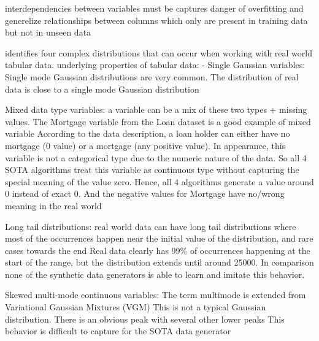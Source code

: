         interdependencies between variables must be captures \cite{lederrey2022DATGANIntegratingExperta}
        danger of overfitting and generelize relationships between columns which only are present in training data but not in unseen data \cite{lederrey2022DATGANIntegratingExperta}




        \cite{zhao2022CTABGANEnhancingTabular} identifies four complex distributions that can occur when working with real world tabular data.
        underlying properties of tabular data: \cite{zhao2022CTABGANEnhancingTabular}
        - Single Gaussian variables:
            Single mode Gaussian distributions are very common.
            The distribution of real data is close to a single mode Gaussian distribution
        
        Mixed data type variables:\cite{zhao2022CTABGANEnhancingTabular}
            a variable can be a mix of these two types + missing values. The Mortgage variable from the Loan dataset is a good example of mixed variable
            According to the data description, a loan holder can either have no mortgage (0 value) or a mortgage (any positive value). 
            In appearance, this variable is not a categorical type due to the numeric nature of the data. 
            So all 4 SOTA algorithms treat this variable as continuous type without capturing the special meaning of the value zero. 
            Hence, all 4 algorithms generate a value around 0 instead of exact 0. And the negative values for Mortgage have no/wrong meaning in the real world
        
        Long tail distributions:\cite{zhao2022CTABGANEnhancingTabular}
            real world data can have long tail distributions where most of the occurrences happen near the initial value of the distribution, and rare cases towards the end
            Real data clearly has 99\% of occurrences happening at the start of the range, 
            but the distribution extends until around 25000. 
            In comparison none of the synthetic data generators is able to learn and imitate this behavior.
        
        Skewed multi-mode continuous variables:\cite{zhao2022CTABGANEnhancingTabular}
            The term multimode is extended from Variational Gaussian Mixtures (VGM)
            This is not a typical Gaussian distribution. There is an obvious peak
            with several other lower peaks
            This behavior is difficult to capture for the SOTA data generator
        